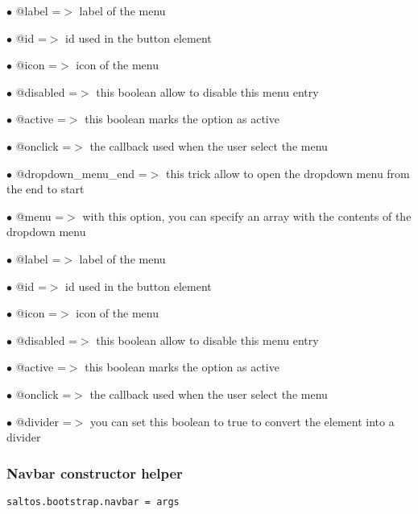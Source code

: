 \documentclass[a4paper]{article}
\begin{document}
\begin{compactitem}
\item[\color{myblue}$\bullet$] @label             =$>$ label of the menu
\item[\color{myblue}$\bullet$] @id                =$>$ id used in the button element
\item[\color{myblue}$\bullet$] @icon              =$>$ icon of the menu
\item[\color{myblue}$\bullet$] @disabled          =$>$ this boolean allow to disable this menu entry
\item[\color{myblue}$\bullet$] @active            =$>$ this boolean marks the option as active
\item[\color{myblue}$\bullet$] @onclick           =$>$ the callback used when the user select the menu
\item[\color{myblue}$\bullet$] @dropdown\_menu\_end =$>$ this trick allow to open the dropdown menu from the end to start
\item[\color{myblue}$\bullet$] @menu              =$>$ with this option, you can specify an array with the contents of the dropdown menu
\end{compactitem}

\begin{compactitem}
\item[\color{myblue}$\bullet$] @label    =$>$ label of the menu
\item[\color{myblue}$\bullet$] @id       =$>$ id used in the button element
\item[\color{myblue}$\bullet$] @icon     =$>$ icon of the menu
\item[\color{myblue}$\bullet$] @disabled =$>$ this boolean allow to disable this menu entry
\item[\color{myblue}$\bullet$] @active   =$>$ this boolean marks the option as active
\item[\color{myblue}$\bullet$] @onclick  =$>$ the callback used when the user select the menu
\item[\color{myblue}$\bullet$] @divider  =$>$ you can set this boolean to true to convert the element into a divider
\end{compactitem}

\hypertarget{toc661}{}
\subsubsection{Navbar constructor helper}

\begin{lstlisting}
saltos.bootstrap.navbar = args
\end{lstlisting}
\end{document}
